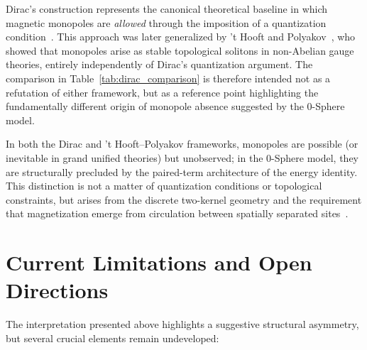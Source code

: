 \documentclass[12pt,letterpaper]{article}
\begin{document}
Dirac's construction represents the canonical theoretical baseline in which magnetic monopoles are \emph{allowed} through the imposition of a quantization condition~\cite{Dirac1931}. This approach was later generalized by 't Hooft and Polyakov~\cite{tHooft1974,Polyakov1974}, who showed that monopoles arise as stable topological solitons in non-Abelian gauge theories, entirely independently of Dirac's quantization argument. The comparison in Table~\ref{tab:dirac_comparison} is therefore intended not as a refutation of either framework, but as a reference point highlighting the fundamentally different origin of monopole absence suggested by the 0-Sphere model.

In both the Dirac and 't Hooft--Polyakov frameworks, monopoles are possible (or inevitable in grand unified theories) but unobserved; in the 0-Sphere model, they are structurally precluded by the paired-term architecture of the energy identity. This distinction is not a matter of quantization conditions or topological constraints, but arises from the discrete two-kernel geometry and the requirement that magnetization emerge from circulation between spatially separated sites~\cite{hanamura18356895}.

\section{Current Limitations and Open Directions}

The interpretation presented above highlights a suggestive structural asymmetry, but several crucial elements remain undeveloped:
\end{document}
